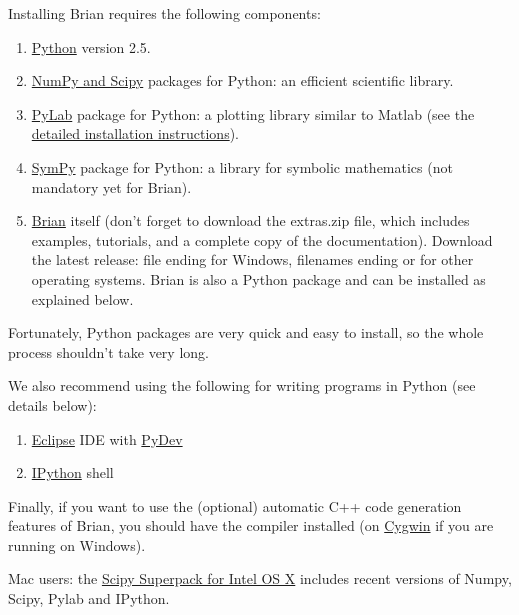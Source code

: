 \documentclass[letterpaper,10pt,english]{manual}
\begin{document}
Installing Brian requires the following components:
\begin{enumerate}
\item {} 
\href{http://www.python.org/download/}{Python} version 2.5.

\item {} 
\href{http://www.scipy.org/Download}{NumPy and Scipy} packages for Python:
an efficient scientific library.

\item {} 
\href{http://matplotlib.sourceforge.net/}{PyLab} package for Python:
a plotting library similar to Matlab
(see the \href{http://matplotlib.sourceforge.net/installing.html}{detailed installation instructions}).

\item {} 
\href{http://code.google.com/p/sympy/}{SymPy} package for Python:
a library for symbolic mathematics (not mandatory yet for Brian).

\item {} 
\href{https://sourceforge.net/project/showfiles.php?group\_id=226798}{Brian} itself (don't forget to download the extras.zip file,
which includes examples, tutorials, and a complete copy of the documentation).
Download the latest release: file ending  for Windows,
filenames ending  or  for other operating systems.
Brian is also a Python package and can be installed as explained below.

\end{enumerate}

Fortunately, Python packages are very quick and easy to install, so the whole process shouldn't
take very long.

We also recommend using the following for writing programs in Python (see details below):
\begin{enumerate}
\item {} 
\href{http://www.eclipse.org/}{Eclipse} IDE with \href{http://pydev.sourceforge.net/}{PyDev}

\item {} 
\href{http://ipython.scipy.org/moin/}{IPython} shell

\end{enumerate}

Finally, if you want to use the (optional) automatic C++ code generation features of Brian, you should
have the  compiler installed (on \href{http://www.cygwin.com/}{Cygwin} if you are
running on Windows).

Mac users: the \href{http://trichech.us/?page\_id=5}{Scipy Superpack for Intel OS X} includes
recent versions of Numpy, Scipy, Pylab and IPython.
\end{document}
